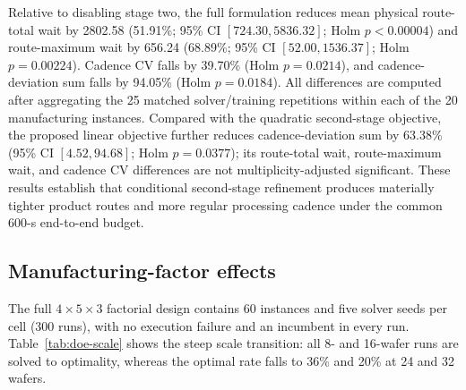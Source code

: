 \documentclass[preprint,12pt,authoryear]{elsarticle}
\begin{document}
\begin{table}[htbp]
\centering
\caption{Controlled two-stage stability study. Route waits and cadence
statistics are reconstructed from physical event times in the saved feasible
schedules; waits are in model time units.}
\label{tab:stability}
\end{table}

Relative to disabling stage two, the full formulation reduces mean physical
route-total wait by 2802.58 (51.91\%; 95\% CI
$[724.30,\allowbreak 5836.32]$; Holm $p<0.00004$) and route-maximum wait by
656.24 (68.89\%; 95\% CI $[52.00,\allowbreak 1536.37]$; Holm $p=0.00224$).
Cadence CV falls by 39.70\% (Holm $p=0.0214$), and cadence-deviation sum falls
by 94.05\% (Holm $p=0.0184$). All differences are computed after aggregating
the 25 matched solver/training repetitions within each of the 20 manufacturing
instances. Compared with the quadratic second-stage objective, the proposed
linear objective further reduces cadence-deviation sum by 63.38\% (95\% CI
$[4.52,\allowbreak 94.68]$; Holm $p=0.0377$); its route-total wait,
route-maximum wait, and cadence CV differences are not multiplicity-adjusted
significant. These results establish that conditional second-stage refinement
produces materially tighter product routes and more regular processing
cadence under the common 600-s end-to-end budget.

\subsection{Manufacturing-factor effects}

The full $4\times5\times3$ factorial design contains 60 instances and five
solver seeds per cell (300 runs), with no execution failure and an incumbent
in every run. Table~\ref{tab:doe-scale} shows the steep scale transition: all
8- and 16-wafer runs are solved to optimality, whereas the optimal rate falls
to 36\% and 20\% at 24 and 32 wafers.
\end{document}
